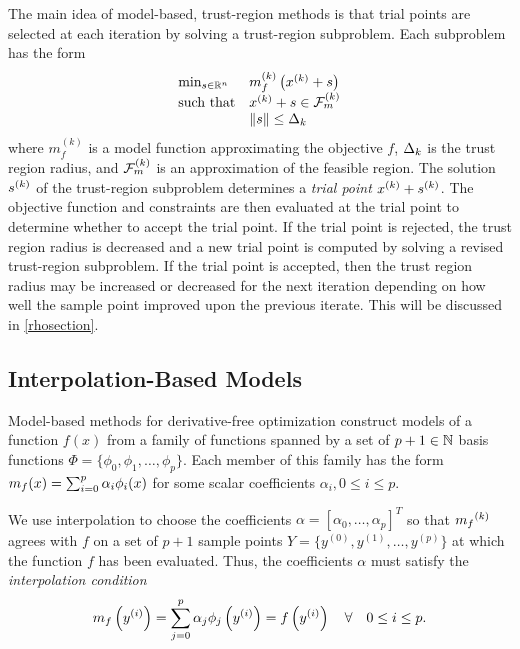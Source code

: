 \documentclass{article}
\begin{document}
The main idea of model-based, trust-region methods is that trial points are selected at each iteration by solving a trust-region subproblem.  
Each subproblem has the form 
\[ \begin{array}{ll} \min_{s \in \mathbb R^n} & m_f^{(k)}\left(x^{(k)} + s\right) \\ 
\textrm{such that} & x^{(k)}+s \in {\mathcal F_m^{(k)}} \\
& {\left\|s\right\|} \le \Delta_k
\end{array} \]
where $m_f^{(k)}$ is a model function approximating the objective $f$, $\Delta_k$ is the trust region radius,
and ${\mathcal F_m^{(k)}}$ is an approximation of the feasible region.
The solution ${{s}^{(k)}}$ of the trust-region subproblem determines a {\em trial point} $x^{(k)} + {{s}^{(k)}}$.  
The objective function and constraints are then evaluated at the trial point to determine whether to accept the trial point.
If the trial point is rejected, the trust region radius is decreased and a new trial point is computed by solving a revised trust-region subproblem.     
If the trial point is accepted, then the trust region radius may be increased or decreased for the next iteration 
depending on how well the sample point improved upon the previous iterate.
This will be discussed in \cref{rhosection}.





\subsection{Interpolation-Based Models}

\label{interpolation}

Model-based methods for derivative-free optimization construct models of a function $f(x)$ from a family of functions spanned by a set of $p + 1 \in \mathbb N$ basis functions  $\Phi = \{\phi_0, \phi_1, \ldots, \phi_p\}$. Each member of this family has the form ${{m}_f}(x) = \sum_{i=0}^p\alpha_i\phi_i(x)$ for some scalar coefficients $\alpha_i, 0 \le i \le p$.

We use interpolation to choose the coefficients $\alpha = [\alpha_0, \ldots, \alpha_p]^T$ so that ${{m}_f}^{(k)}$ agrees with $f$ on a set of $p+1$ sample points $Y = \{y^{(0)}, y^{(1)}, \ldots, y^{(p)}\}$ at which the function $f$ has been evaluated.
Thus, the coefficients $\alpha$ must satisfy the \emph{interpolation condition}
\begin{align}
\label{interpolation_condition}
{{m}_f}\left(y^{(i)}\right) = \sum^p_{j=0}\alpha_j\phi_j\left(y^{(i)}\right) = f\left(y^{(i)}\right) \quad \forall \quad 0 \le i \le p.
\end{align}
\end{document}
